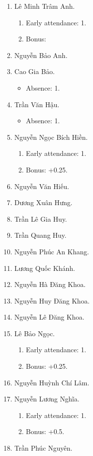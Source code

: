 \documentclass{article}
\begin{document}
\begin{enumerate}
	\item {\sc Lê Minh Trâm Anh.}
	\begin{enumerate}
		\item Early attendance: 1.
		\item Bonus: 
	\end{enumerate}
	\item {\sc Nguyễn Bảo Anh.}
	\item {\sc Cao Gia Bảo.}
	\begin{itemize}
		\item Absence: 1.
	\end{itemize}
	\item {\sc Trần Văn Hậu.}
	\begin{itemize}
		\item Absence: 1.
	\end{itemize}
	\item {\sc Nguyễn Ngọc Bích Hiền.}
	\begin{enumerate}
		\item Early attendance: 1.
		\item Bonus: +0.25.
	\end{enumerate}
	\item {\sc Nguyễn Văn Hiếu.}
	\item {\sc Dương Xuân Hưng.}
	\item {\sc Trần Lê Gia Huy.}
	\item {\sc Trần Quang Huy.}
	\item {\sc Nguyễn Phúc An Khang.}
	\item {\sc Lương Quốc Khánh.}
	\item {\sc Nguyễn Hà Đăng Khoa}.
	\item {\sc Nguyễn Huy Đăng Khoa.}
	\item {\sc Nguyễn Lê Đăng Khoa.}
	\item {\sc Lê Bảo Ngọc.}
	\begin{enumerate}
		\item Early attendance: 1.
		\item Bonus: +0.25.
	\end{enumerate}
	\item {\sc Nguyễn Huỳnh Chí Lâm.}
	\item {\sc Nguyễn Lương Nghĩa.}
	\begin{enumerate}
		\item Early attendance: 1.
		\item Bonus: +0.5.
	\end{enumerate}
	\item {\sc Trần Phúc Nguyên.}

\end{enumerate}
\end{document}
